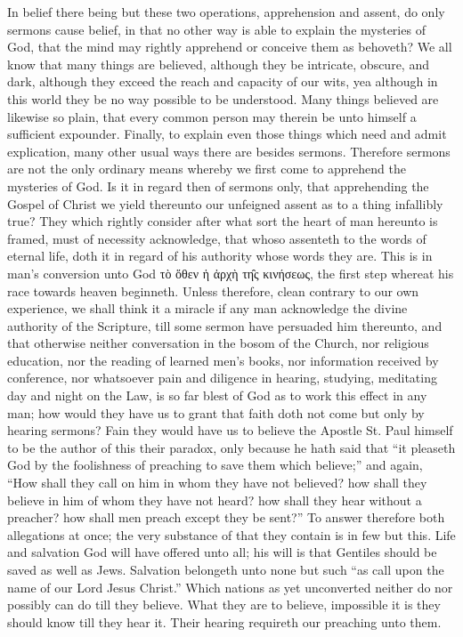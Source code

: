 In belief there being but these two operations, apprehension  and assent, do only sermons cause belief, in that no other way is able to explain the mysteries of God, that the mind may rightly apprehend or conceive them as behoveth? We all know that many things are believed, although they be intricate, obscure, and dark, although they exceed the reach and capacity of our wits, yea although in this world they be no way possible to be understood. Many things believed are likewise so plain, that every common person may therein be unto himself a sufficient expounder. Finally, to explain even those things which need and admit explication, many other usual ways there are besides sermons. Therefore sermons are not the only ordinary means whereby we first come to apprehend the mysteries of God.
Is it in regard then of sermons only, that apprehending the Gospel of Christ we yield thereunto our unfeigned assent as to a thing infallibly true? They which rightly consider after what sort the heart of man hereunto is framed, must of necessity acknowledge, that whoso assenteth to the words of eternal life, doth it in regard of his authority whose words they are. This is in man’s conversion unto God τὸ ὅθεν ἡ ἀρχὴ τη̑ς κινήσεως, the first step whereat his race towards heaven beginneth. Unless therefore, clean contrary to our own experience, we shall think it a miracle if any man acknowledge the divine authority of the Scripture, till some sermon have persuaded him thereunto, and that otherwise neither conversation in the bosom of the Church, nor religious education, nor the reading of learned men’s books, nor information received by conference, nor whatsoever pain and diligence in hearing, studying, meditating day and night on the Law, is so far blest of God as to work this effect in any man; how would they have us to grant that faith doth not come but only by hearing sermons?
Fain they would have us to believe the Apostle St. Paul himself to be the author of this their paradox, only because he hath said that “it pleaseth God by the foolishness of preaching to save them which believe;” and again, “How shall they call on him in whom they have not believed? how shall they believe in him of whom they have not heard? how shall they hear without a preacher? how shall men preach except they be sent?”
To answer therefore both allegations at once; the very substance of that they contain is in few but this. Life and salvation God will have offered unto all; his will is that Gentiles should be saved as well as Jews. Salvation belongeth unto none but such “as call upon the name of our Lord Jesus Christ.” Which nations as yet unconverted neither do nor possibly can do till they believe. What they are to believe, impossible it is they should know till they hear it. Their hearing requireth our preaching unto them.
